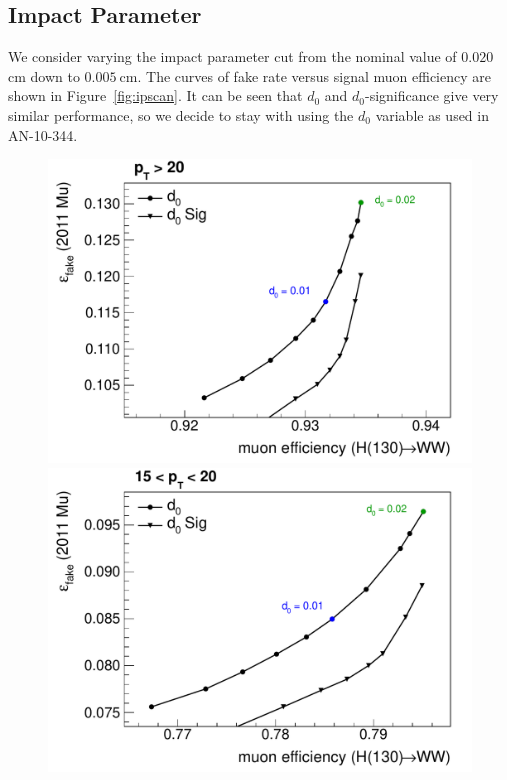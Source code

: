 \subsection{Impact Parameter}
We consider varying the impact parameter cut from the nominal value of $0.020\:$cm down to $0.005\:$cm. The curves of fake rate versus signal muon efficiency are shown in Figure~\ref{fig:ipscan}. It can be seen that $d_0$ and $d_0$-significance give very similar performance, so we decide to stay with using the $d_0$ variable as used in AN-10-344.

\begin{figure}[!htbp]
\begin{center}
\includegraphics[scale=0.4]{figures/ipscan0.pdf}
\includegraphics[scale=0.4]{figures/ipscan1.pdf}

\end{center}
\end{figure}
